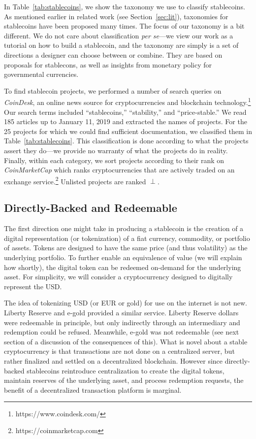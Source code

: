 

In Table~\ref{tab:stablecoins}, we show the taxonomy we use to classify stablecoins. As mentioned earlier in related work (see Section~\ref{sec:lit}), taxonomies for stablecoins have been proposed many times. The focus of our taxonomy is a bit different. We do not care about classification \textit{per se}---we view our work as a tutorial on how to build a stablecoin, and the taxonomy are simply is a set of directions a designer can choose between or combine. They are based on proposals for stablecons, as well as insights from monetary policy for governmental currencies.

To find stablecoin projects, we performed a number of search queries on \textit{CoinDesk}, an online news source for cryptocurrencies and blockchain technology.\footnote{https://www.coindesk.com/} Our search terms included ``stablecoins,'' ``stability,'' and ``price-stable.'' We read 185 articles up to January 11, 2019 and extracted the names of projects. For the 25 projects for which we could find sufficient documentation, we classified them in Table~\ref{tab:stablecoins}. This classification is done according to what the projects assert they do---we provide no warranty of what the projects do in reality. Finally, within each category, we sort projects according to their rank on \textit{CoinMarketCap} which ranks cryptocurrencies that are actively traded on an exchange service.\footnote{https://coinmarketcap.com} Unlisted projects are ranked $\perp$.


\subsection{Directly-Backed and Redeemable}
\label{sec:redeem}

The first direction one might take in producing a stablecoin is the creation of a digital representation (or tokenization) of a fiat currency, commodity, or portfolio of assets. Tokens are designed to have the same price (and thus volatility) as the underlying portfolio. To further enable an equivalence of value (we will explain how shortly), the digital token can be redeemed on-demand for the underlying asset. For simplicity, we will consider a cryptocurrency designed to digitally represent the USD.

The idea of tokenizing USD (or EUR or gold) for use on the internet is not new. Liberty Reserve and e-gold provided a similar service. Liberty Reserve dollars were redeemable in principle, but only indirectly through an intermediary and redemption could be refused. Meanwhile, e-gold was not redeemable (see next section of a discussion of the consequences of this). What is novel about a stable cryptocurrency is that transactions are not done on a centralized server, but rather finalized and settled on a decentralized blockchain. However since directly-backed stablecoins reintroduce centralization to create the digital tokens, maintain reserves of the underlying asset, and process redemption requests, the benefit of a decentralized transaction platform is marginal.

